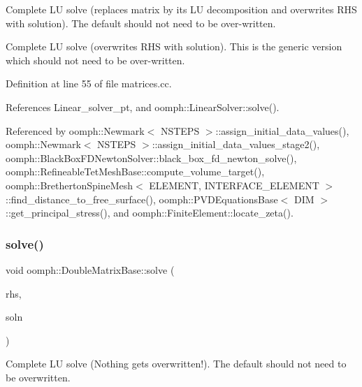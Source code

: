 Complete LU solve (replaces matrix by its LU decomposition and overwrites R\+HS with solution). The default should not need to be over-\/written. 

Complete LU solve (overwrites R\+HS with solution). This is the generic version which should not need to be over-\/written. 

Definition at line 55 of file matrices.\+cc.



References Linear\+\_\+solver\+\_\+pt, and oomph\+::\+Linear\+Solver\+::solve().



Referenced by oomph\+::\+Newmark$<$ N\+S\+T\+E\+P\+S $>$\+::assign\+\_\+initial\+\_\+data\+\_\+values(), oomph\+::\+Newmark$<$ N\+S\+T\+E\+P\+S $>$\+::assign\+\_\+initial\+\_\+data\+\_\+values\+\_\+stage2(), oomph\+::\+Black\+Box\+F\+D\+Newton\+Solver\+::black\+\_\+box\+\_\+fd\+\_\+newton\+\_\+solve(), oomph\+::\+Refineable\+Tet\+Mesh\+Base\+::compute\+\_\+volume\+\_\+target(), oomph\+::\+Bretherton\+Spine\+Mesh$<$ E\+L\+E\+M\+E\+N\+T, I\+N\+T\+E\+R\+F\+A\+C\+E\+\_\+\+E\+L\+E\+M\+E\+N\+T $>$\+::find\+\_\+distance\+\_\+to\+\_\+free\+\_\+surface(), oomph\+::\+P\+V\+D\+Equations\+Base$<$ D\+I\+M $>$\+::get\+\_\+principal\+\_\+stress(), and oomph\+::\+Finite\+Element\+::locate\+\_\+zeta().

\mbox{\label{classoomph_1_1DoubleMatrixBase_ac35083cf8225822363c25b921b4ca1ce}} 
\subsubsection{\texorpdfstring{solve()}{solve()}\hspace{0.1cm}{\footnotesize\ttfamily [2/4]}}
{\footnotesize\ttfamily void oomph\+::\+Double\+Matrix\+Base\+::solve (\begin{DoxyParamCaption}\item[{const \hyperlink{classoomph_1_1DoubleVector}{Double\+Vector} \&}]{rhs,  }\item[{\hyperlink{classoomph_1_1DoubleVector}{Double\+Vector} \&}]{soln }\end{DoxyParamCaption})}



Complete LU solve (Nothing gets overwritten!). The default should not need to be overwritten. 

